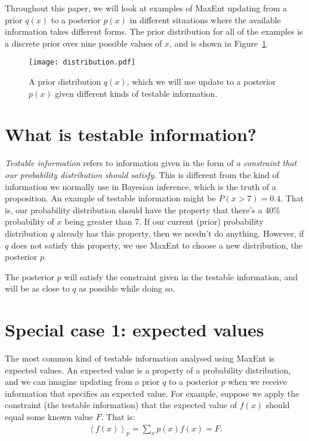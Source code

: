 \documentclass[a4paper, 11pt]{article}
\begin{document}
Throughout this paper, we will look at examples of MaxEnt updating from a prior
$q(x)$ to a posterior $p(x)$ in different situations where the available
information takes different forms. The prior distribution for all of the
examples is a discrete prior over nine possible values of $x$, and is shown
in Figure~\ref{fig:distribution}.

\begin{figure}
\begin{center}
\texttt{[image: distribution.pdf]}
\caption{A prior distribution $q(x)$, which we will use
update to a posterior $p(x)$ given different kinds of testable information.
\label{fig:distribution}}
\end{center}
\end{figure}

\section{What is testable information?}
{\it Testable information} refers to information given in the form of
{\it a constraint that our probability distribution should satisfy}. This is
different from the kind of information we normally use in Bayesian inference,
which is the truth of a proposition. An example of testable information
might be $P(x > 7) = 0.4$. That is, our probability distribution should have
the property that there's a 40\% probability of $x$ being greater than 7.
If our current (prior) probability distribution $q$ already has this property,
then we needn't do anything. However, if $q$ does not satisfy this property,
we use MaxEnt to choose a new distribution, the posterior $p$.

The posterior $p$ will satisfy the constraint given in the testable information,
and will be as close to $q$ as possible while doing so.



\section{Special case 1: expected values}\label{sec:expectations}
The most common kind of testable information analysed using MaxEnt is
expected values. An expected value is a property of a probability distribution,
and we can imagine updating from a prior $q$ to a posterior
$p$ when we receive information that specifies an expected value.
For example, suppose we apply the constraint (the testable information)
that the expected value of $f(x)$ should equal some known value $F$. That is:
\begin{eqnarray}
\left<f(x)\right>_p = \sum_x p(x)f(x) = F.\label{eq:expected_value}
\end{eqnarray}
\end{document}
